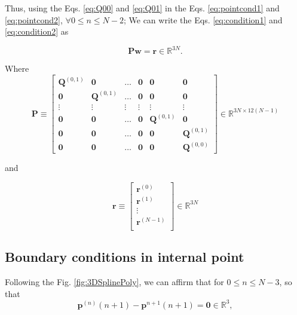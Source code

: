 Thus,
using the Eqs. \ref{eq:Q00} and \ref{eq:Q01} in 
the Eqs. \ref{eq:pointcond1} and \ref{eq:pointcond2}, 
$\forall 0 \leq n\leq N-2$;
We can write the Eqs. \ref{eq:condition1} and \ref{eq:condition2} as 

\begin{equation}
\mathbf{P}
\mathbf{w}
=\mathbf{r}\in \mathbb{R}^{3N}.
\end{equation}

Where
\begin{equation}
\mathbf{P}
\equiv
\begin{bmatrix}
\mathbf{Q}^{(0,1)} & \mathbf{0}         & \hdots & \mathbf{0} & \mathbf{0}         & \mathbf{0}\\
\mathbf{0}         & \mathbf{Q}^{(0,1)} & \hdots & \mathbf{0} & \mathbf{0}         & \mathbf{0}\\
\vdots             & \vdots             & \vdots & \vdots     & \vdots             & \vdots    \\ 
\mathbf{0}         & \mathbf{0}         & \hdots & \mathbf{0} & \mathbf{Q}^{(0,1)} & \mathbf{0}\\
\mathbf{0}         & \mathbf{0}         & \hdots & \mathbf{0} & \mathbf{0}         & \mathbf{Q}^{(0,1)}\\
\mathbf{0}         & \mathbf{0}         & \hdots & \mathbf{0} & \mathbf{0}         & \mathbf{Q}^{(0,0)}
\end{bmatrix}
\in \mathbb{R}^{3N\times 12(N-1)}
\end{equation}

and

\begin{equation}
\mathbf{r}
\equiv
\begin{bmatrix}
\mathbf{r}^{(0)}\\
\mathbf{r}^{(1)}\\
\vdots\\
\mathbf{r}^{(N-1)}\\
\end{bmatrix}
\in \mathbb{R}^{3N}
\end{equation}


\subsection{Boundary conditions in internal point}
Following the Fig. \ref{fig:3DSplinePoly}, 
we can affirm that for $0 \leq n\leq N-3$,
so that
\begin{equation}\label{eq:bound1}
\mathbf{p}^{(n)}(n+1)-\mathbf{p}^{n+1}(n+1)
=
\mathbf{0}\in \mathbb{R}^{3},
\end{equation}

